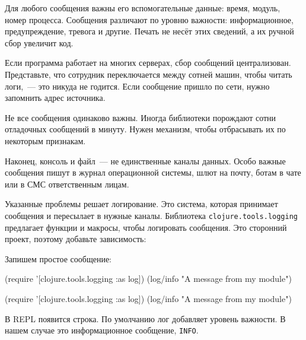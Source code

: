 Для любого сообщения важны его вспомогательные данные: время, модуль, номер
процесса. Сообщения различают по уровню важности: информационное,
предупреждение, тревога и другие. Печать не несёт этих сведений, а их ручной
сбор увеличит код.

Если программа работает на многих серверах, сбор сообщений
централизован. Представьте, что сотрудник переключается между сотней машин,
чтобы читать логи,~--- это никуда не годится. Если сообщение пришло по сети,
нужно запомнить адрес источника.

Не все сообщения одинаково важны. Иногда библиотеки порождают сотни отладочных
сообщений в минуту. Нужен механизм, чтобы отбрасывать их по некоторым признакам.

Наконец, консоль и файл~--- не единственные каналы данных. Особо важные
сообщения пишут в журнал операционной системы, шлют на почту, ботам в чате или в
СМС ответственным лицам.

Указанные проблемы решает логирование. Это система, которая принимает сообщения
и пересылает в нужные каналы. Библиотека \verb|clojure.tools.logging|
предлагает функции и макросы, чтобы логировать сообщения. Это сторонний проект,
поэтому добавьте зависимость:


\begin{english}
  \begin{clojure}
  \end{clojure}
\end{english}

\noindent
Запишем простое сообщение:

\ifx\DEVICETYPE\MOBILE

\begin{english}
  \begin{clojure}
(require
  '[clojure.tools.logging :as log])
(log/info "A message from my module")
  \end{clojure}
\end{english}

\else

\begin{english}
  \begin{clojure}
(require '[clojure.tools.logging :as log])
(log/info "A message from my module")
  \end{clojure}
\end{english}

\fi

\noindent
В REPL появится строка. По умолчанию лог добавляет уровень важности. В нашем
случае это информационное сообщение, \verb|INFO|.

